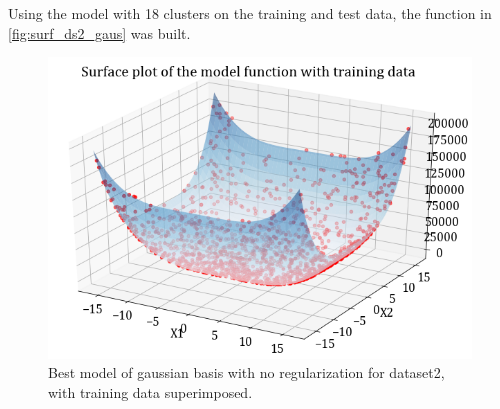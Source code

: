 \documentclass[12pt,a4paper]{article}
\begin{document}
Using the model with 18 clusters on the training and test data, the function in \autoref{fig:surf_ds2_gaus} was built. 
\begin{figure}[H]
    \centering
    \includegraphics[scale=0.4]{images/surface_gaus_ds2_noreg.png}
    \caption{Best model of gaussian basis with no regularization for dataset2, with training data superimposed.}
    \label{fig:surf_ds2_gaus}
\end{figure}
\end{document}
